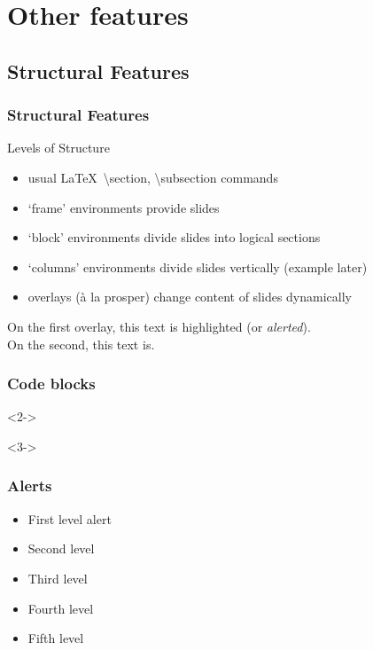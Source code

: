 \documentclass[aspectratio=169]{beamer}
\begin{document}
    \section[]{Other features} %


    \subsection{Structural Features}
    \begin{frame}
        \frametitle{Structural Features}
        \begin{block}{Levels of Structure}
            \begin{itemize}
                \item usual \LaTeX\ \textbackslash{}section, \textbackslash{}subsection
                commands
                \item `frame' environments provide slides
                \item `block' environments divide slides into logical sections
                \item `columns' environments divide slides vertically (example later)
                \item overlays (\`a la prosper) change content of slides dynamically
            \end{itemize}
        \end{block}

        \begin{example}
            On the first overlay, \alert<1>{this text} is highlighted (or \emph{alerted}).\\ On the second, \alert<2>{this text} is.
        \end{example}
    \end{frame}

    \begin{frame}[fragile]
        \frametitle{Code blocks}
        
        \begin{uncoverenv}<2->
        \end{uncoverenv}
        \begin{uncoverenv}<3->
            
        \end{uncoverenv}

    \end{frame}

    \begin{frame}
        \frametitle{Alerts}
        \begin{itemize}
            \item First level \alert{alert}
            \item Second level 
            \item Third level 
            \item Fourth level 
            \item Fifth level 
        \end{itemize}

    \end{frame}
\end{document}
